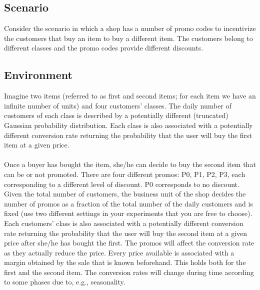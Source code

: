 \subsection*{Scenario}
 Consider the scenario in which a shop has a number of promo codes to incentivize the customers that buy an item to buy a different item. The customers belong to different classes and the promo codes provide different discounts. 
\subsection*{Environment}
 Imagine two items (referred to as first and second items; for each item we have an infinite number of units) and four customers’ classes. The daily number of customers of each class is described by a potentially different (truncated) Gaussian probability distribution. Each class is also associated with a potentially different conversion rate returning the probability that the user will buy the first item at a given price.
\paragraph{}
Once a buyer has bought the item, she/he can decide to buy the second item that can be or not promoted. There are four different promos: P0, P1, P2, P3, each corresponding to a different level of discount. P0 corresponds to no discount. Given the total number of customers, the business unit of the shop decides the number of promos as a fraction of the total number of the daily customers and is fixed (use two different settings in your experiments that you are free to choose). Each customers’ class is also associated with a potentially different conversion rate returning the probability that the user will buy the second item at a given price after she/he has bought the first. The promos will affect the conversion rate as they actually reduce the price. 
Every price available is associated with a margin obtained by the sale that is known beforehand. This holds both for the first and the second item. 
The conversion rates will change during time according to some phases due to, e.g., seasonality.
